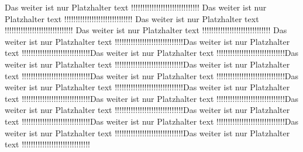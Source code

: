 Das weiter ist nur Platzhalter text !!!!!!!!!!!!!!!!!!!!!!!!!!!!!!
Das weiter ist nur Platzhalter text !!!!!!!!!!!!!!!!!!!!!!!!!!!!!!
Das weiter ist nur Platzhalter text !!!!!!!!!!!!!!!!!!!!!!!!!!!!!!
Das weiter ist nur Platzhalter text !!!!!!!!!!!!!!!!!!!!!!!!!!!!!!
Das weiter ist nur Platzhalter text !!!!!!!!!!!!!!!!!!!!!!!!!!!!!!Das weiter ist nur Platzhalter text !!!!!!!!!!!!!!!!!!!!!!!!!!!!!!Das weiter ist nur Platzhalter text !!!!!!!!!!!!!!!!!!!!!!!!!!!!!!Das weiter ist nur Platzhalter text !!!!!!!!!!!!!!!!!!!!!!!!!!!!!!Das weiter ist nur Platzhalter text !!!!!!!!!!!!!!!!!!!!!!!!!!!!!!Das weiter ist nur Platzhalter text !!!!!!!!!!!!!!!!!!!!!!!!!!!!!!Das weiter ist nur Platzhalter text !!!!!!!!!!!!!!!!!!!!!!!!!!!!!!Das weiter ist nur Platzhalter text !!!!!!!!!!!!!!!!!!!!!!!!!!!!!!Das weiter ist nur Platzhalter text !!!!!!!!!!!!!!!!!!!!!!!!!!!!!!Das weiter ist nur Platzhalter text !!!!!!!!!!!!!!!!!!!!!!!!!!!!!!Das weiter ist nur Platzhalter text !!!!!!!!!!!!!!!!!!!!!!!!!!!!!!Das weiter ist nur Platzhalter text !!!!!!!!!!!!!!!!!!!!!!!!!!!!!!Das weiter ist nur Platzhalter text !!!!!!!!!!!!!!!!!!!!!!!!!!!!!!Das weiter ist nur Platzhalter text !!!!!!!!!!!!!!!!!!!!!!!!!!!!!!